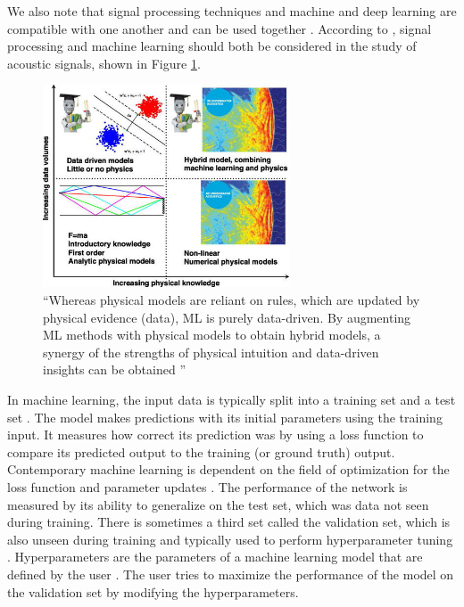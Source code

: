 \documentclass[report.tex]{subfiles}
\begin{document}
We also note that signal processing techniques and machine and deep learning are compatible with one another and can be used together \parencite{mlsp1, mlsp2}. According to \citeauthor{mldspmix}, signal processing and machine learning should both be considered in the study of acoustic signals, shown in Figure \ref{fig:dspmlmix}.

\begin{figure}[ht]
	\centering
	\includegraphics[width=0.65\textwidth]{./images-neural/dspmlmix.jpg}
	\caption{``Whereas physical models are reliant on rules, which are updated by physical evidence (data), ML is purely data-driven. By augmenting ML methods with physical models to obtain hybrid models, a synergy of the strengths of physical intuition and data-driven insights can be obtained \parencite[3,591]{mldspmix}''}
	\label{fig:dspmlmix}
\end{figure}

In machine learning, the input data is typically split into a training set and a test set \parencite{introtoml}. The model makes predictions with its initial parameters using the training input. It measures how correct its prediction was by using a loss function to compare its predicted output to the training (or ground truth) output. Contemporary machine learning is dependent on the field of optimization \parencite{boyd2004convex, mlopt1, mlopt2} for the loss function and parameter updates \parencite{sgd}. The performance of the network is measured by its ability to generalize on the test set, which was data not seen during training. There is sometimes a third set called the validation set, which is also unseen during training and typically used to perform hyperparameter tuning \parencite{splitvaliddata}. Hyperparameters are the parameters of a machine learning model that are defined by the user \parencite{introtodl}. The user tries to maximize the performance of the model on the validation set by modifying the hyperparameters.
\end{document}
